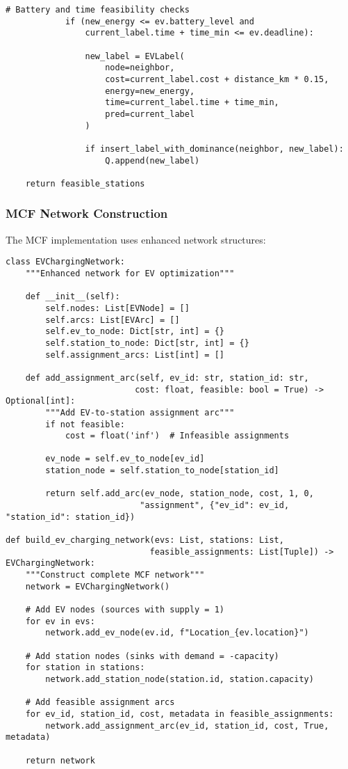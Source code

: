 \documentclass[12pt,a4paper]{article}
\begin{document}
\begin{lstlisting}[caption=ECSP Label-Setting Algorithm]
            # Battery and time feasibility checks
            if (new_energy <= ev.battery_level and 
                current_label.time + time_min <= ev.deadline):
                
                new_label = EVLabel(
                    node=neighbor,
                    cost=current_label.cost + distance_km * 0.15,
                    energy=new_energy,
                    time=current_label.time + time_min,
                    pred=current_label
                )
                
                if insert_label_with_dominance(neighbor, new_label):
                    Q.append(new_label)
    
    return feasible_stations
\end{lstlisting}

\subsubsection{MCF Network Construction}
The MCF implementation uses enhanced network structures:

\begin{lstlisting}[caption=MCF Network Builder]
class EVChargingNetwork:
    """Enhanced network for EV optimization"""
    
    def __init__(self):
        self.nodes: List[EVNode] = []
        self.arcs: List[EVArc] = []
        self.ev_to_node: Dict[str, int] = {}
        self.station_to_node: Dict[str, int] = {}
        self.assignment_arcs: List[int] = []
    
    def add_assignment_arc(self, ev_id: str, station_id: str, 
                          cost: float, feasible: bool = True) -> Optional[int]:
        """Add EV-to-station assignment arc"""
        if not feasible:
            cost = float('inf')  # Infeasible assignments
        
        ev_node = self.ev_to_node[ev_id]
        station_node = self.station_to_node[station_id]
        
        return self.add_arc(ev_node, station_node, cost, 1, 0, 
                           "assignment", {"ev_id": ev_id, "station_id": station_id})

def build_ev_charging_network(evs: List, stations: List, 
                             feasible_assignments: List[Tuple]) -> EVChargingNetwork:
    """Construct complete MCF network"""
    network = EVChargingNetwork()
    
    # Add EV nodes (sources with supply = 1)
    for ev in evs:
        network.add_ev_node(ev.id, f"Location_{ev.location}")
    
    # Add station nodes (sinks with demand = -capacity)
    for station in stations:
        network.add_station_node(station.id, station.capacity)
    
    # Add feasible assignment arcs
    for ev_id, station_id, cost, metadata in feasible_assignments:
        network.add_assignment_arc(ev_id, station_id, cost, True, metadata)
    
    return network
\end{lstlisting}
\end{document}
